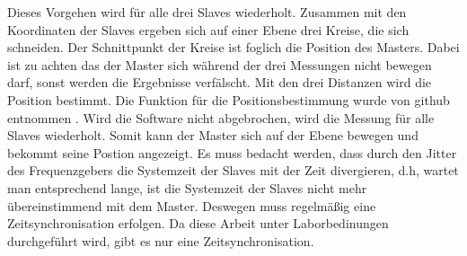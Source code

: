 Dieses Vorgehen wird für alle drei Slaves wiederholt. Zusammen mit den Koordinaten der Slaves ergeben sich auf einer Ebene drei Kreise, die sich schneiden. Der Schnittpunkt der Kreise ist foglich die Position des Masters. Dabei ist zu achten das der Master sich während der drei Messungen nicht bewegen darf, sonst werden die Ergebnisse verfälscht. Mit den drei Distanzen wird die Position bestimmt. Die Funktion für die Positionsbestimmung wurde von github entnommen \cite{src_GITHUB_CODE}. Wird die Software nicht abgebrochen, wird die Messung für alle Slaves wiederholt. Somit kann der Master sich auf der Ebene bewegen und bekommt seine Postion angezeigt. Es muss bedacht werden, dass durch den Jitter des Frequenzgebers die Systemzeit der Slaves mit der Zeit divergieren, d.h, wartet man entsprechend lange, ist die Systemzeit der Slaves nicht mehr übereinstimmend mit dem Master. Deswegen muss regelmäßig eine Zeitsynchronisation erfolgen. Da diese Arbeit unter Laborbedinungen durchgeführt wird, gibt es nur eine Zeitsynchronisation.

